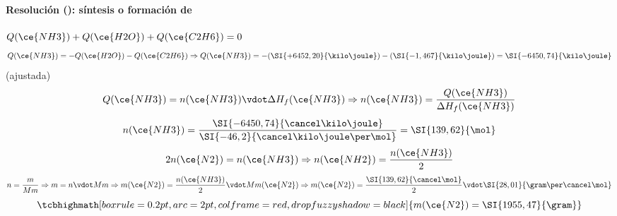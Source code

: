 \begin{frame}
	\frametitle{\ejerciciocmd}
	\framesubtitle{Resolución (): síntesis o formación de }
	 $Q(\ce{NH3}) + Q(\ce{H2O}) + Q(\ce{C2H6}) = 0$
	$$
		Q(\ce{NH3}) = -Q(\ce{H2O}) -Q(\ce{C2H6})\Rightarrow
		Q(\ce{NH3}) = -(\SI{+6452,20}{\kilo\joule}) - (\SI{-1,467}{\kilo\joule})
					= \SI{-6450,74}{\kilo\joule}
	$$
	  (ajustada)\\
	$$
		Q(\ce{NH3}) = n(\ce{NH3})\vdot\Delta H_f(\ce{NH3})												 \Rightarrow
		n(\ce{NH3}) = \frac{Q(\ce{NH3})}{\Delta H_f(\ce{NH3})}
	$$
	$$
		n(\ce{NH3}) = \frac{\SI{-6450,74}{\cancel\kilo\joule}}{\SI{-46,2}{\cancel\kilo\joule\per\mol}} = \SI{139,62}{\mol}
	$$
	$$
		2n(\ce{N2}) = n(\ce{NH3})\Rightarrow n(\ce{NH2}) = \frac{n(\ce{NH3})}{2}
	$$
	$$
		n = \frac{m}{Mm}\Rightarrow m = n\vdot Mm\Rightarrow m(\ce{N2})=\frac{n(\ce{NH3})}{2}\vdot Mm(\ce{N2})\Rightarrow
		m(\ce{N2}) = \frac{\SI{139,62}{\cancel\mol}}{2}\vdot\SI{28,01}{\gram\per\cancel\mol}
	$$
	$$
		\tcbhighmath[boxrule=0.2pt,arc=2pt,colframe=red,drop fuzzy shadow=black]{m(\ce{N2}) = \SI{1955,47}{\gram}}
	$$
\end{frame}